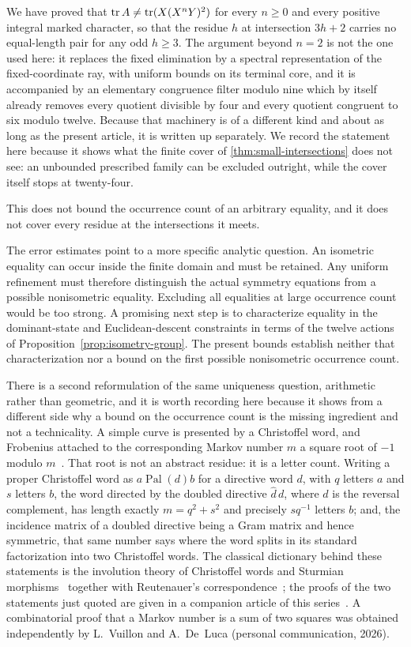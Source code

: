 We have proved that $\operatorname{tr} A\ne\operatorname{tr}(X(X^nY)^2)$ for every $n\geqslant0$ and every
positive integral marked character, so that the residue $h$ at intersection
$3h+2$ carries no equal-length pair for any odd $h\geqslant3$. The argument
beyond $n=2$ is not the one used here: it replaces the fixed elimination by a
spectral representation of the fixed-coordinate ray, with uniform bounds on
its terminal core, and it is accompanied by an elementary congruence filter
modulo nine which by itself already removes every quotient divisible by four
and every quotient congruent to six modulo twelve. Because that machinery is
of a different kind and about as long as the present article, it is written up
separately. We record the statement here because it shows what the finite
cover of \cref{thm:small-intersections} does not see: an unbounded prescribed
family can be excluded outright, while the cover itself stops at twenty-four.

This does not bound the occurrence count of an arbitrary equality, and it does
not cover every residue at the intersections it meets.

The error estimates point to a more specific analytic question. An
isometric equality can occur inside the finite domain and must be
retained. Any uniform refinement must therefore distinguish the actual
symmetry equations from a possible nonisometric equality. Excluding all
equalities at large occurrence count would be too strong. A promising
next step is to characterize equality in the dominant-state and
Euclidean-descent constraints in terms of the twelve actions of
Proposition~\ref{prop:isometry-group}. The present bounds establish
neither that characterization nor a bound on the first possible
nonisometric occurrence count.

There is a second reformulation of the same uniqueness question, arithmetic
rather than geometric, and it is worth recording here because it shows from a
different side why a bound on the occurrence count is the missing ingredient
and not a technicality. A simple curve is presented by a Christoffel word, and
Frobenius attached to the corresponding Markov number $m$ a square root of $-1$
modulo $m$~\cite{Frobenius1913}. That root is not an abstract residue: it is a
letter count. Writing a proper Christoffel word as $a\operatorname{Pal}(d)b$
for a directive word $d$, with $q$ letters $a$ and $s$ letters $b$, the word
directed by the doubled directive $\widehat d\,d$, where $\widehat d$ is the
reversal complement, has length exactly $m=q^2+s^2$ and precisely $sq^{-1}$
letters $b$; and, the incidence matrix of a doubled directive being a Gram
matrix and hence symmetric, that same number says where the word splits in its
standard factorization into two Christoffel words. The classical dictionary
behind these statements is the involution theory of Christoffel words and
Sturmian morphisms~\cite[Section~3]{BertheDeLucaReutenauer2008} together with
Reutenauer's correspondence~\cite{Reutenauer2009}; the proofs of the two
statements just quoted are given in a companion article of this
series~\cite{DutykhVuillon2026Reflections}. A
combinatorial proof that a Markov number is a sum of two squares was obtained
independently by L.~Vuillon and A.~De~Luca (personal communication, 2026).

